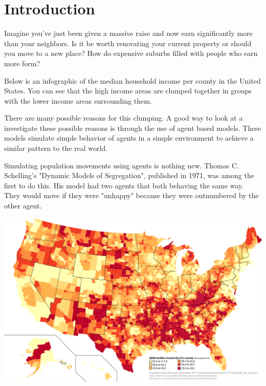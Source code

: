 \section{Introduction}

\par
Imagine you've just been given a massive raise and now earn significantly more than your neighbors. Is it be worth renovating your current property or should you move to a new place? How do expensive suburbs filled with people who earn more form?

\par
Below is an infographic of the median household income per county in the United States. You can see that the high income areas are clumped together in groups with the lower income areas surrounding them.

\par
There are many possible reasons for this clumping. A good way to look at a investigate these possible reasons is through the use of agent based models\cite{abm-wiki}. These models simulate simple behavior of agents in a simple environment to achieve a similar pattern to the real world.

\par
Simulating population movements using agents is nothing new. Thomas C. Schelling's "Dynamic Models of Segregation", published in 1971, was among the first to do this. His model had two agents that both behaving the same way. They would move if they were "unhappy" because they were outnumbered by the other agent.

\par
\includegraphics[width=15cm]{images/income_by_county_large_us}


